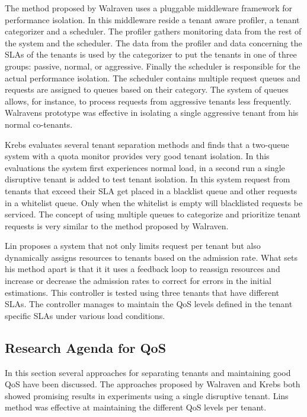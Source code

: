 The method proposed by Walraven uses a pluggable middleware framework for performance isolation.
In this middleware reside a tenant aware profiler, a tenant categorizer and a scheduler. 
The profiler gathers monitoring data from the rest of the system and the scheduler.
The data from the profiler and data concerning the \acp{SLA} of the tenants is used by the categorizer to put the tenants in one of three groups: passive, normal, or aggressive.
Finally the scheduler is responsible for the actual performance isolation.
The scheduler contains multiple request queues and requests are assigned to queues based on their category.
The system of queues allows, for instance, to process requests from aggressive tenants less frequently.
Walravens prototype was effective in isolating a single aggressive tenant from his normal co-tenants.

Krebs evaluates several tenant separation methods and finds that a two-queue system with a quota monitor provides very good tenant isolation.
In this evaluations the system first experiences normal load, in a second run a single disruptive tenant is added to test tenant isolation.
In this system request from tenants that exceed their \ac{SLA} get placed in a blacklist queue and other requests in a whitelist queue. 
Only when the whitelist is empty will blacklisted requests be serviced.
The concept of using multiple queues to categorize and prioritize tenant requests is very similar to the method proposed by Walraven.

Lin proposes a system that not only limits request per tenant but also dynamically assigns resources to tenants based on the admission rate.
What sets his method apart is that it it uses a feedback loop to reassign resources and increase or decrease the admission rates to correct for errors in the initial estimations.
This controller is tested using three tenants that have different \acp{SLA}. 
The controller manages to maintain the \ac{QoS} levels defined in the tenant specific \acp{SLA} under various load conditions.

\subsection{Research Agenda for \ac{QoS}}
In this section several approaches for separating tenants and maintaining good \ac{QoS} have been discussed.
The approaches proposed by Walraven and Krebs both showed promising results in experiments using a single disruptive tenant.
Lins method was effective at maintaining the different \ac{QoS} levels per tenant.

